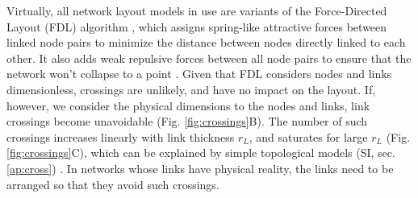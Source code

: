 \documentclass[nofootinbib,preprint,floatfix,titlepage,endfloats]{revtex4} %
\begin{document}
Virtually, all network layout models in use are variants of the Force-Directed Layout (FDL) algorithm \cite{kamada1989algorithm,davidson1996drawing,fruchterman1991graph,barnes1986hierarchical}, which assigns spring-like attractive forces between linked node pairs to minimize the distance between nodes directly linked to each other. It also adds weak repulsive forces between all node pairs to ensure that the network won't collapse to a point  %
 \cite{kabourov2015spring}.
Given that FDL considers nodes and links dimensionless, crossings are unlikely, and have no impact on the layout.
If, however, we consider the physical dimensions to the nodes and links, link crossings become unavoidable (Fig. \ref{fig:crossings}B). 
The number of such crossings increases linearly with link thickness $r_L$, and saturates for large $r_L$ (Fig. \ref{fig:crossings}C), which can be explained by simple topological models (SI, sec. \ref{ap:cross}) . In networks whose links have physical reality, the links need to be  arranged so that they avoid such crossings.
\end{document}
